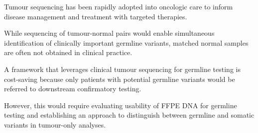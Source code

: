 Tumour sequencing has been rapidly adopted into oncologic care to inform disease management and treatment with targeted therapies.

While sequencing of tumour-normal pairs would enable simultaneous identification of clinically important germline variants, matched normal samples are often not obtained in clinical practice.

A framework that leverages clinical tumour sequencing for germline testing is cost-saving because only patients with potential germline variants would be referred to downstream confirmatory testing.

However, this would require evaluating usability of FFPE DNA for germline testing and establishing an approach to distinguish between germline and somatic variants in tumour-only analyses.

